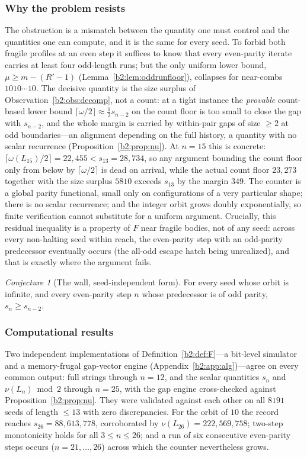 \documentclass[a4paper]{article}
\theoremstyle{plain}
\theoremstyle{definition}
\theoremstyle{remark}
\newtheorem{conjecture}{Conjecture}[subsection]
\begin{document}
\subsubsection{Why the problem resists}\label{b2:sec:wall}
The obstruction is a mismatch between the quantity one must control and the quantities one can compute, and it is the same for every seed. To forbid both fragile profiles at an even step it suffices to know that every even-parity iterate carries at least four odd-length runs; but the only uniform lower bound, $\mu\ge m-(R'-1)$ (Lemma~\ref{b2:lem:oddrunfloor}), collapses for near-combs $1010\cdots10$. The decisive quantity is the size surplus of Observation~\ref{b2:obs:decomp}, not a count: at a tight instance the \emph{provable} count-based lower bound $\lceil\omega/2\rceil\approx\tfrac12 s_{n-2}$ on the count floor is too small to close the gap with $s_{n-2}$, and the whole margin is carried by within-pair gaps of size $\ge 2$ at odd boundaries---an alignment depending on the full history, a quantity with no scalar recurrence (Proposition~\ref{b2:prop:nu}). At $n=15$ this is concrete: $\lceil\omega(L_{15})/2\rceil=22{,}455<s_{13}=28{,}734$, so any argument bounding the count floor only from below by $\lceil\omega/2\rceil$ is dead on arrival, while the actual count floor $23{,}273$ together with the size surplus $5810$ exceeds $s_{13}$ by the margin $349$. The counter is a global parity functional, small only on configurations of a very particular shape; there is no scalar recurrence; and the integer orbit grows doubly exponentially, so finite verification cannot substitute for a uniform argument. Crucially, this residual inequality is a property of $F$ near fragile bodies, not of any seed: across every non-halting seed within reach, the even-parity step with an odd-parity predecessor eventually occurs (the all-odd escape hatch being unrealized), and that is exactly where the argument fails.

\begin{conjecture}[The wall, seed-independent form]\label{b2:conj:wall}
For every seed whose orbit is infinite, and every even-parity step $n$ whose predecessor is of odd parity, $s_n\ge s_{n-2}$.
\end{conjecture}

\subsubsection{Computational results}\label{b2:sec:comp}
Two independent implementations of Definition~\ref{b2:def:F}---a bit-level simulator and a memory-frugal gap-vector engine (Appendix~\ref{b2:app:alg})---agree on every common output: full strings through $n=12$, and the scalar quantities $s_n$ and $\nu(L_n)\bmod 2$ through $n=25$, with the gap engine cross-checked against Proposition~\ref{b2:prop:nu}. They were validated against each other on all $8191$ seeds of length $\le 13$ with zero discrepancies. For the orbit of $10$ the record reaches $s_{26}=88{,}613{,}778$, corroborated by $\nu(L_{26})=222{,}569{,}758$; two-step monotonicity holds for all $3\le n\le 26$; and a run of six consecutive even-parity steps occurs ($n=21,\dots,26$) across which the counter nevertheless grows.
\end{document}
